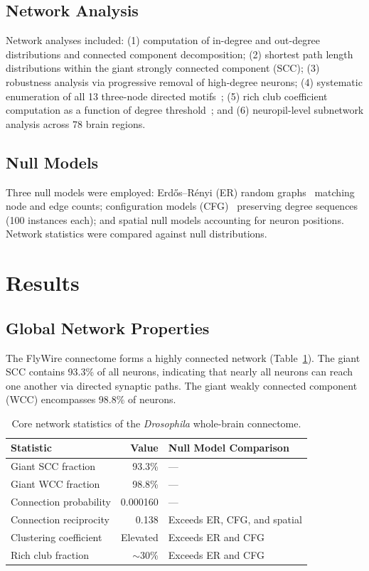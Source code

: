 \documentclass[11pt]{article}
\begin{document}
\subsection{Network Analysis}

Network analyses included: (1) computation of in-degree and out-degree distributions and connected component decomposition; (2) shortest path length distributions within the giant strongly connected component (SCC); (3) robustness analysis via progressive removal of high-degree neurons; (4) systematic enumeration of all 13 three-node directed motifs~\citep{milo2002network}; (5) rich club coefficient computation as a function of degree threshold~\citep{colizza2006detecting}; and (6) neuropil-level subnetwork analysis across 78 brain regions.

\subsection{Null Models}

Three null models were employed: Erd\H{o}s--R\'enyi (ER) random graphs~\citep{erdos1959random} matching node and edge counts; configuration models (CFG)~\citep{maslov2002specificity} preserving degree sequences (100 instances each); and spatial null models accounting for neuron positions.  Network statistics were compared against null distributions.

\section{Results}

\subsection{Global Network Properties}

The FlyWire connectome forms a highly connected network (Table~\ref{tab:network}).  The giant SCC contains 93.3\% of all neurons, indicating that nearly all neurons can reach one another via directed synaptic paths.  The giant weakly connected component (WCC) encompasses 98.8\% of neurons.

\begin{table}[ht]
\centering
\caption{Core network statistics of the \emph{Drosophila} whole-brain connectome.}
\label{tab:network}
\begin{tabular}{@{}lrl@{}}
\toprule
Statistic & Value & Null Model Comparison \\
\midrule
Giant SCC fraction & 93.3\% & --- \\
Giant WCC fraction & 98.8\% & --- \\
Connection probability & 0.000160 & --- \\
Connection reciprocity & 0.138 & Exceeds ER, CFG, and spatial \\
Clustering coefficient & Elevated & Exceeds ER and CFG \\
Rich club fraction & $\sim$30\% & Exceeds ER and CFG \\
\bottomrule
\end{tabular}
\end{table}
\end{document}
